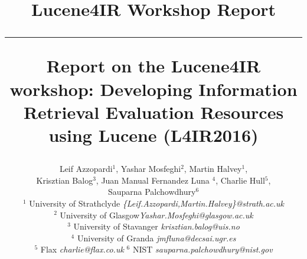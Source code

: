 \documentclass[12pt]{article}
\begin{document}
\title{\vspace{-2.5cm}
\begin{center}
\textbf{\small{Lucene4IR Workshop Report}}\\\vspace{-0.5cm} \rule{17.5cm}{1pt}
\end{center}
\vspace{1cm}\textbf{Report on the Lucene4IR workshop: Developing Information Retrieval Evaluation Resources using Lucene (L4IR2016) }}

\newcommand{\todo}[1]{\textcolor{red}{#1}}
\author{
Leif Azzopardi$^{1}$, Yashar Mosfeghi$^{2}$, Martin Halvey$^{1}$, \\Krisztian Balog$^{3}$, Juan Manual Fernandez Luna $^{4}$, Charlie Hull$^{5}$,\\ Sauparna Palchowdhury$^{6}$\\
    $^{1}$ {\small University of Strathclyde  \emph{ \{Leif.Azzopardi,Martin.Halvey\}@strath.ac.uk}}\\
    $^{2}$ {\small University of Glasgow\emph{\small Yashar.Mosfeghi@glasgow.ac.uk}}\\
	$^{3}$ {\small University of Stavanger \emph{\small krisztian.balog@uis.no}}\\
	$^{4}$ {\small University of Granda \emph{\small jmfluna@decsai.ugr.es}}\\
	$^{5}$ {\small Flax \emph{\small charlie@flax.co.uk}}
	$^{6}$ {\small NIST \emph{\small sauparna.palchowdhury@nist.gov}}
}
\end{document}
